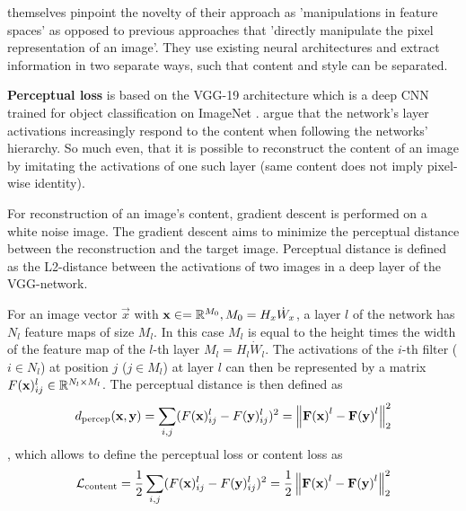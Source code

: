 \citeauthor*{gatys} themselves pinpoint the novelty of their approach as 'manipulations in feature spaces' as opposed to previous approaches that 'directly manipulate the pixel representation of an image'\cite{gatys}.
They use existing neural architectures and extract information in two separate ways, such that content and style can be separated.


\textbf{Perceptual loss} is based on the VGG-19 architecture \cite{VGG} which is a deep CNN trained for object classification on ImageNet \cite{imagenet}.
\citeauthor*{gatys} argue that the network's layer activations increasingly respond to the content when following the networks' hierarchy.
So much even, that it is possible to reconstruct the content of an image by imitating the activations of one such layer (same content does not imply pixel-wise identity).

For reconstruction of an image's content, gradient descent is performed on a white noise image.
The gradient descent aims to minimize the perceptual distance between the reconstruction and the target image.
Perceptual distance is defined as the L2-distance between the activations of two images in a deep layer of the VGG-network.

For an image vector $\vec{x}$ with $\mathbf{x} \in = \mathbb{R}^{M_0}, M_0 = H_x \dot W_x $, a layer $l$ of the network has $N_l$ feature maps of size $M_l$.
In this case $M_l$ is equal to the height times the width of the feature map of the $l$-th layer  $M_l = H_l \dot W_l $.
The activations of the $i$-th filter ($i \in N_l$) at position $j$ ($j \in M_l$) at layer $l$ can then be represented by a matrix $F(\mathbf{x})_{ij}^l \in \mathbb{R}^{N_l \times M_l}$.
The perceptual distance is then defined as
\begin{align}
    d_{\text{percep}}(\mathbf{x}, \mathbf{y}) = \sum_{i, j} (F(\mathbf{x})_{ij}^l - F(\mathbf{y})_{ij}^l)^2 = \left\lVert\mathbf{F(\mathbf{x})}^l - \mathbf{F(\mathbf{y})}^l\right\rVert_2^2
\end{align}
, which allows to define the perceptual loss or content loss as 
\begin{align}
    \mathcal{L}_{\text{content}} = \frac{1}{2} \sum_{i, j} (F(\mathbf{x})_{ij}^l - F(\mathbf{y})_{ij}^l)^2 = \frac{1}{2} \left\lVert\mathbf{F(\mathbf{x})}^l - \mathbf{F(\mathbf{y})}^l\right\rVert_2^2
\end{align}

